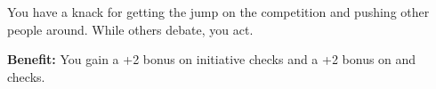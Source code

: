 
You have a knack for getting the jump on the competition and pushing other people around. While others debate, you act.

\textbf{Benefit:} You gain a +2 bonus on initiative checks and a +2 bonus on  and  checks.